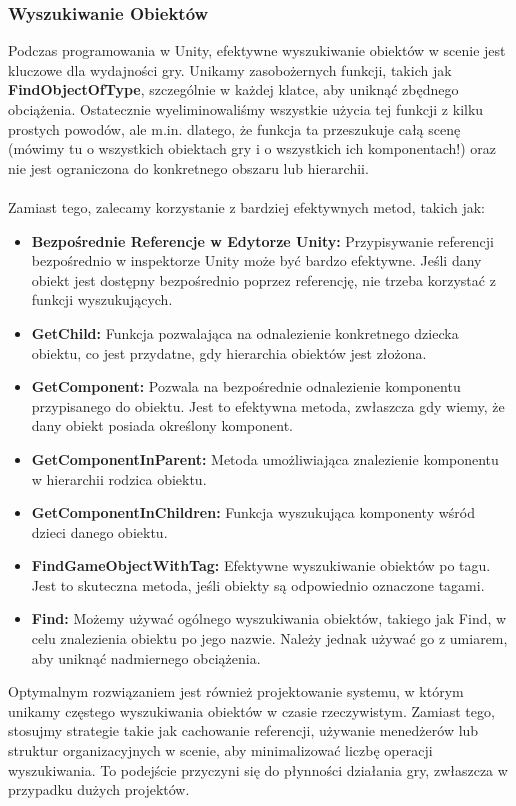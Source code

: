 \subsubsection{Wyszukiwanie Obiektów}
Podczas programowania w Unity, efektywne wyszukiwanie obiektów w scenie jest kluczowe dla wydajności gry. Unikamy zasobożernych funkcji, takich jak \textbf{FindObjectOfType}, szczególnie w każdej klatce, aby uniknąć zbędnego obciążenia. Ostatecznie wyeliminowaliśmy wszystkie użycia tej funkcji z kilku prostych powodów, ale m.in. dlatego, że funkcja ta przeszukuje całą scenę (mówimy tu o wszystkich obiektach gry i o wszystkich ich komponentach!) oraz nie jest ograniczona do konkretnego obszaru lub hierarchii.\\ \\
Zamiast tego, zalecamy korzystanie z bardziej efektywnych metod, takich jak:
\begin{itemize}
    \item \textbf{Bezpośrednie Referencje w Edytorze Unity:} Przypisywanie referencji bezpośrednio w inspektorze Unity może być bardzo efektywne. Jeśli dany obiekt jest dostępny bezpośrednio poprzez referencję, nie trzeba korzystać z funkcji wyszukujących.
    \item \textbf{GetChild:} Funkcja pozwalająca na odnalezienie konkretnego dziecka obiektu, co jest przydatne, gdy hierarchia obiektów jest złożona.
    \item \textbf{GetComponent:} Pozwala na bezpośrednie odnalezienie komponentu przypisanego do obiektu. Jest to efektywna metoda, zwłaszcza gdy wiemy, że dany obiekt posiada określony komponent.
    \item \textbf{GetComponentInParent:} Metoda umożliwiająca znalezienie komponentu w hierarchii rodzica obiektu.
    \item \textbf{GetComponentInChildren:} Funkcja wyszukująca komponenty wśród dzieci danego obiektu.
    \item \textbf{FindGameObjectWithTag:} Efektywne wyszukiwanie obiektów po tagu. Jest to skuteczna metoda, jeśli obiekty są odpowiednio oznaczone tagami.
    \item \textbf{Find:} Możemy używać ogólnego wyszukiwania obiektów, takiego jak Find, w celu znalezienia obiektu po jego nazwie. Należy jednak używać go z umiarem, aby uniknąć nadmiernego obciążenia.
\end{itemize}
Optymalnym rozwiązaniem jest również projektowanie systemu, w którym unikamy częstego wyszukiwania obiektów w czasie rzeczywistym. Zamiast tego, stosujmy strategie takie jak cachowanie referencji, używanie menedżerów lub struktur organizacyjnych w scenie, aby minimalizować liczbę operacji wyszukiwania. To podejście przyczyni się do płynności działania gry, zwłaszcza w przypadku dużych projektów.
